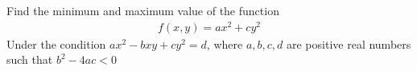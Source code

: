 Find the minimum and maximum value of the function
\begin{align*} f(x,y)=ax^2+cy^2 \end{align*}Under the condition $ax^2-bxy+cy^2=d$, where $a,b,c,d$ are positive real numbers such that $b^2 -4ac <0$